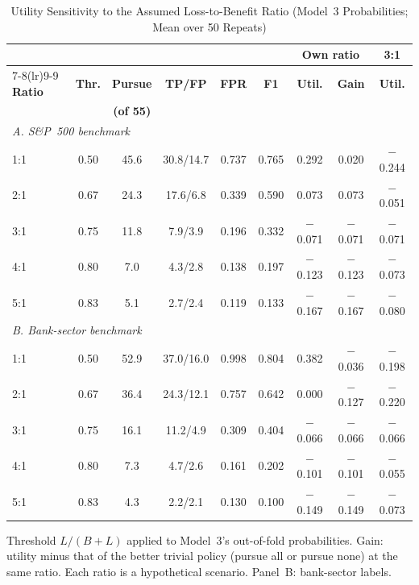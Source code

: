 \begin{table}[!t]
\caption{Utility Sensitivity to the Assumed Loss-to-Benefit Ratio (Model~3 Probabilities; Mean over 50 Repeats)}
\label{tab:sensitivity}
\centering
\footnotesize
\setlength{\tabcolsep}{2.2pt}
\begin{tabular}{lcccccccc}
\toprule
 & & & & & & \multicolumn{2}{c}{\textbf{Own ratio}} & \textbf{3:1} \\
\cmidrule(lr){7-8}\cmidrule(lr){9-9}
\textbf{Ratio} & \textbf{Thr.} & \textbf{Pursue} & \textbf{TP/FP} & \textbf{FPR} & \textbf{F1} & \textbf{Util.} & \textbf{Gain} & \textbf{Util.} \\
 & & \textbf{(of 55)} & & & & & & \\
\midrule
\multicolumn{9}{l}{\textit{A. S\&P~500 benchmark}} \\
1:1 & 0.50 & 45.6 & 30.8/14.7 & 0.737 & 0.765 & 0.292 & 0.020 & $-$0.244 \\
2:1 & 0.67 & 24.3 & 17.6/6.8 & 0.339 & 0.590 & 0.073 & 0.073 & $-$0.051 \\
3:1 & 0.75 & 11.8 & 7.9/3.9 & 0.196 & 0.332 & $-$0.071 & $-$0.071 & $-$0.071 \\
4:1 & 0.80 & 7.0 & 4.3/2.8 & 0.138 & 0.197 & $-$0.123 & $-$0.123 & $-$0.073 \\
5:1 & 0.83 & 5.1 & 2.7/2.4 & 0.119 & 0.133 & $-$0.167 & $-$0.167 & $-$0.080 \\
\midrule
\multicolumn{9}{l}{\textit{B. Bank-sector benchmark}} \\
1:1 & 0.50 & 52.9 & 37.0/16.0 & 0.998 & 0.804 & 0.382 & $-$0.036 & $-$0.198 \\
2:1 & 0.67 & 36.4 & 24.3/12.1 & 0.757 & 0.642 & 0.000 & $-$0.127 & $-$0.220 \\
3:1 & 0.75 & 16.1 & 11.2/4.9 & 0.309 & 0.404 & $-$0.066 & $-$0.066 & $-$0.066 \\
4:1 & 0.80 & 7.3 & 4.7/2.6 & 0.161 & 0.202 & $-$0.101 & $-$0.101 & $-$0.055 \\
5:1 & 0.83 & 4.3 & 2.2/2.1 & 0.130 & 0.100 & $-$0.149 & $-$0.149 & $-$0.073 \\
\bottomrule
\end{tabular}
\par\vspace{2pt}\parbox{0.94\columnwidth}{\scriptsize Threshold $L/(B+L)$ applied to Model~3's out-of-fold probabilities. Gain: utility
minus that of the better trivial policy (pursue all or pursue none) at the same ratio. Each ratio is a hypothetical scenario. Panel~B: bank-sector labels.}
\end{table}
